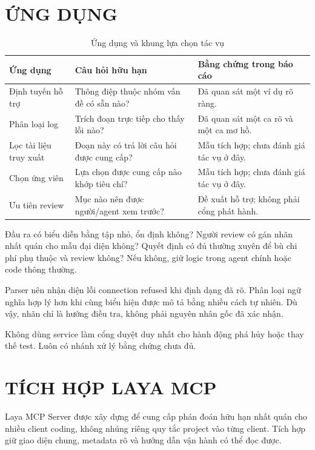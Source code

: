 \documentclass[10pt,a4paper]{article}
\begin{document}
\section{ỨNG DỤNG}
\begin{table}[H]
\centering\small
\renewcommand{\arraystretch}{1.15}
\begin{tabularx}{\linewidth}{@{}YYY@{}}
\toprule
\textbf{Ứng dụng} & \textbf{Câu hỏi hữu hạn} & \textbf{Bằng chứng trong báo cáo} \\
\midrule
Định tuyến hỗ trợ & Thông điệp thuộc nhóm vấn đề có sẵn nào? & Đã quan sát một ví dụ rõ ràng. \\
Phân loại log & Trích đoạn trực tiếp cho thấy lỗi nào? & Đã quan sát một ca rõ và một ca mơ hồ. \\
Lọc tài liệu truy xuất & Đoạn này có trả lời câu hỏi được cung cấp? & Mẫu tích hợp; chưa đánh giá tác vụ ở đây. \\
Chọn ứng viên & Lựa chọn được cung cấp nào khớp tiêu chí? & Mẫu tích hợp; chưa đánh giá tác vụ ở đây. \\
Ưu tiên review & Mục nào nên được người/agent xem trước? & Đề xuất hỗ trợ; không phải cổng phát hành. \\
\bottomrule
\end{tabularx}
\caption{Ứng dụng và khung lựa chọn tác vụ}
\end{table}
Đầu ra có biểu diễn bằng tập nhỏ, ổn định không? Người review có gán nhãn nhất quán cho mẫu đại diện không? Quyết định có đủ thường xuyên để bù chi phí phụ thuộc và review không? Nếu không, giữ logic trong agent chính hoặc code thông thường.

Parser nên nhận diện lỗi connection refused khi định dạng đã rõ. Phân loại ngữ nghĩa hợp lý hơn khi cùng biểu hiện được mô tả bằng nhiều cách tự nhiên. Dù vậy, nhãn chỉ là hướng điều tra, không phải nguyên nhân gốc đã xác nhận.

Không dùng service làm cổng duyệt duy nhất cho hành động phá hủy hoặc thay thế test. Luôn có nhánh xử lý bằng chứng chưa đủ.

\section{TÍCH HỢP LAYA MCP}
Laya MCP Server được xây dựng để cung cấp phán đoán hữu hạn nhất quán cho nhiều client coding, không nhúng riêng quy tắc project vào từng client. Tích hợp giữ giao diện chung, metadata rõ và hướng dẫn vận hành có thể đọc được. \cite{r2,r5,r6}
\end{document}
